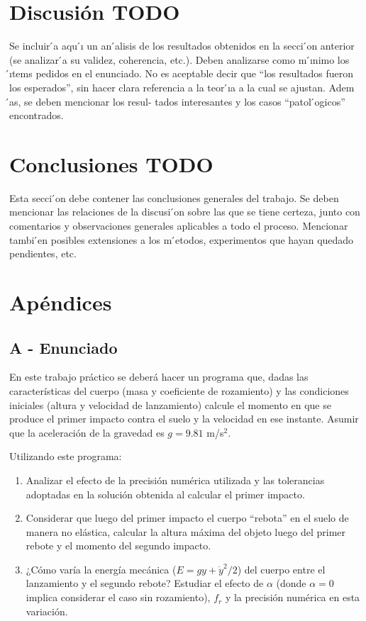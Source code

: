 \documentclass[a4paper]{article}
\begin{document}
\section{Discusión TODO}
Se incluir ́a aqu ́ı un an ́alisis de los resultados obtenidos en la secci ́on anterior (se analizar ́a su validez, coherencia, etc.). Deben analizarse como m ́ınimo los  ́ıtems pedidos en el enunciado. No es aceptable decir que “los resultados fueron los esperados”, sin hacer clara referencia a la teor ́ıa a la cual se ajustan. Adem ́as, se deben mencionar los resul- tados interesantes y los casos “patol ́ogicos” encontrados.

\section{Conclusiones TODO}
Esta secci ́on debe contener las conclusiones generales del trabajo. Se deben mencionar las relaciones de la discusi ́on sobre las que se tiene certeza, junto con comentarios y observaciones generales aplicables a todo el proceso. Mencionar tambi ́en posibles extensiones a los m ́etodos, experimentos que hayan quedado pendientes, etc.

\newpage

\section{Apéndices}
\subsection{A - Enunciado}

En este trabajo práctico se deberá hacer un programa que, dadas las características del cuerpo (masa y coeficiente de rozamiento) y las condiciones iniciales (altura y velocidad de lanzamiento) calcule el momento en que se produce el primer impacto contra el suelo y la velocidad en ese instante. Asumir que la aceleración de la gravedad es $g = 9.81$ m/s$^2$.

Utilizando este programa:
\begin{enumerate}
  \item Analizar el efecto de la precisión numérica utilizada y las tolerancias adoptadas en la solución obtenida al calcular el primer impacto.
  
  \item Considerar que luego del primer impacto el cuerpo ``rebota'' en el suelo de manera no elástica, calcular la altura máxima del objeto luego del primer rebote y el momento del segundo impacto.

  \item ¿Cómo varía la energía mecánica ($E = g y +\dot{y}^2/2$) del cuerpo entre el lanzamiento y el segundo rebote? Estudiar el efecto de $\alpha$ (donde $\alpha = 0$ implica considerar el caso sin rozamiento), $f_r$ y la precisión numérica en esta variación.
\end{enumerate}
\end{document}
